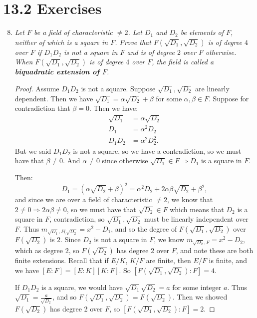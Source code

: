 \documentclass[10pt,oneside,reqno]{amsart}
\theoremstyle{plain}
\theoremstyle{definition}
\theoremstyle{remark}
\theoremstyle{plain}
\newcommand{\bb}{\vspace{3mm}}
\newcommand{\bee}{\begin{equation}\begin{aligned}}
\newcommand{\eee}{\end{aligned}\end{equation}}
\newcommand{\fracc}{\frac}
\begin{document}
\bb\bb


\section*{13.2 Exercises}

\begin{enumerate}[label=\arabic*.]
\setcounter{enumi}{7}

\item \textit{Let $F$ be a field of characteristic $\neq 2$. Let $D_1$ and $D_2$ be elements of $F$, neither of which is a square in $F$. Prove that $F(\sqrt{D_1},\sqrt{D_2})$ is of degree $4$ over $F$ if $D_1D_2$ is not a square in $F$ and is of degree $2$ over $F$ otherwise. When $F(\sqrt{D_1},\sqrt{D_2})$ is of degree $4$ over $F$, the field is called a \textbf{biquadratic extension of $F$}. }

\begin{proof}
Assume $D_1D_2$ is not a square. Suppose $\sqrt{D_1},\sqrt{D_2}$ are linearly dependent. Then we have $\sqrt{D_1} = \alpha\sqrt{ D_2} + \beta$ for some $\alpha,\beta \in F$. Suppose for contradiction that $\beta = 0$. Then we have:
\bee
\sqrt{D_1} &= \alpha \sqrt{D_2}\\
D_1 &= \alpha^2D_2\\
D_1D_2 &= \alpha^2D_2^2.
\eee
But we said $D_1D_2$ is not a square, so we have a contradiction, so we must have that $\beta \neq 0$. And $\alpha \neq 0$ since otherwise $\sqrt{D_1} \in F \Rightarrow D_1$ is a square in $F$. 

Then: 
$$
D_1 = (\alpha\sqrt{ D_2} + \beta)^2 = \alpha^2D_2 + 2\alpha\beta\sqrt{D_2} + \beta^2,
$$
and since we are over a field of characteristic $\neq 2$, we know that $2\neq 0 \Rightarrow 2\alpha\beta \neq 0$, so we must have that $\sqrt{D_2} \in F$ which means that $D_2$ is a square in $F$, contradiction, so $\sqrt{D_1},\sqrt{D_2}$ must be linearly independent over $F$. Thus $m_{\sqrt{D_1},F(\sqrt{D_2}} = x^2 - D_1$, and so the degree of $F(\sqrt{D_1},\sqrt{D_2})$ over $F(\sqrt{D_2})$ is $2$. Since $D_2$ is not a square in $F$, we know $m_{\sqrt{D_2},F} = x^2 - D_2$, which as degree $2$, so $F(\sqrt{D_2})$ has degree 2 over $F$, and note these are both finite extensions. Recall that if $E/K$, $K/F$ are finite, then $E/F$ is finite, and we have $[E:F] = [E:K][K:F]$. So $[F(\sqrt{D_1},\sqrt{D_2}):F] = 4$. 


If $D_1D_2$ is a square, we would have $\sqrt{D_1}\sqrt{D_2} = a$ for some integer $a$. Thus $\sqrt{D_1} = \fracc{a}{\sqrt{D_2}}$, and so $F(\sqrt{D_1},\sqrt{D_2}) = F(\sqrt{D_2})$. Then we showed $F(\sqrt{D_2})$ has degree 2 over $F$, so $[F(\sqrt{D_1},\sqrt{D_2}):F] = 2$. 
\end{proof}


\end{enumerate}
\end{document}
